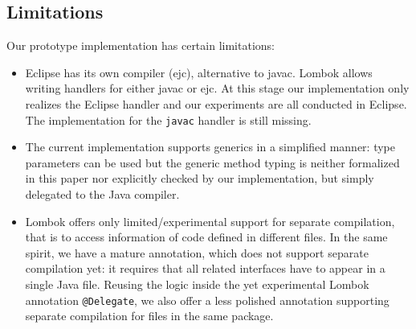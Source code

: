 \subsection{Limitations}
Our prototype implementation has certain limitations:
\begin{itemize}
\item Eclipse has its own compiler (ejc), alternative to javac.
  Lombok allows writing handlers for either javac or ejc.
  At this stage our implementation only realizes the Eclipse handler and our
  experiments are all conducted in Eclipse. The implementation for
  the \texttt{javac} handler is still missing.
\item The current implementation supports generics in a simplified manner:
type parameters can be used but the generic
method typing is neither formalized in this paper nor explicitly checked by our
implementation, but simply  delegated to the Java compiler.
\item
Lombok offers only limited/experimental support for separate compilation, that is
to access information of code defined in different files.
In the same spirit, we have a mature \mixin annotation, which
does not support separate compilation yet: it requires that all
  related interfaces have to appear in a single Java file.
Reusing the logic inside the yet experimental Lombok annotation \lstinline{@Delegate},
we also offer a less polished annotation supporting
separate compilation for files in the same package.
\end{itemize}



